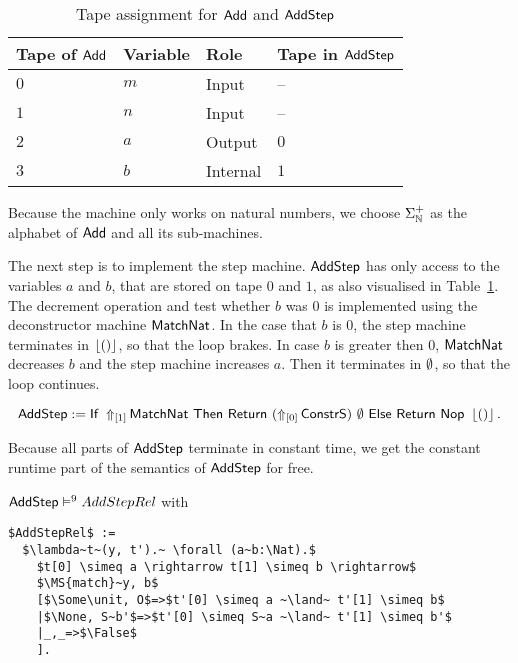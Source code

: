 \begin{table}[h]
  \centering
  \begin{tabular}{l|l|l|l}
     Tape of $\MS{Add}$ & Variable & Role      & Tape in $\MS{AddStep}$ \\ \hline
     $0$                & $m$      & Input     & --                     \\
     $1$                & $n$      & Input     & --                     \\
     $2$                & $a$      & Output    & $0$                    \\
     $3$                & $b$      & Internal  & $1$                    \\
  \end{tabular}
  \caption{Tape assignment for $\MS{Add}$ and $\MS{AddStep}$}
  \label{tab:tapes-Add}
\end{table}

Because the machine only works on natural numbers, we choose $\Sigma_\Nat^+$ as the alphabet of $\MS{Add}$ and all its sub-machines.

The next step is to implement the step machine.  $\MS{AddStep}$ has only access to the variables $a$ and $b$, that are stored on tape $0$ and $1$, as
also visualised in Table~\ref{tab:tapes-Add}.  The decrement operation and test whether $b$ was $0$ is implemented using the deconstructor machine
$\MS{MatchNat}$.  In the case that $b$ is $0$, the step machine terminates in $\Some\unit$, so that the loop brakes.  In case $b$ is greater then $0$,
$\MS{MatchNat}$ decreases $b$ and the step machine increases $a$.  Then it terminates in $\None$, so that the loop continues.
\begin{definition}
  \label{def:Add_Step}
  \[
    \MS{AddStep} := \If{\LiftTapes{\MS{MatchNat}}{\Vector{1}}}{\Return{(\LiftTapes{\MS{ConstrS}}{\Vector{0}})}{\None}}{\Return{\Nop}{\Some\unit}}.
  \]
\end{definition}

Because all parts of $\MS{AddStep}$ terminate in constant time, we get the constant runtime part of the semantics of $\MS{AddStep}$ for free.
\begin{lemma}
  \label{lem:Add_Step_Sem}
  $\MS{AddStep} \RealiseIn{9} AddStepRel$ with
\begin{lstlisting}[style=semicoqstyle]
$AddStepRel$ :=
  $\lambda~t~(y, t').~ \forall (a~b:\Nat).$
    $t[0] \simeq a \rightarrow t[1] \simeq b \rightarrow$
    $\MS{match}~y, b$
    [$\Some\unit, O$=>$t'[0] \simeq a ~\land~ t'[1] \simeq b$
    |$\None, S~b'$=>$t'[0] \simeq S~a ~\land~ t'[1] \simeq b'$
    |_,_=>$\False$
    ].
\end{lstlisting}
\end{lemma}

